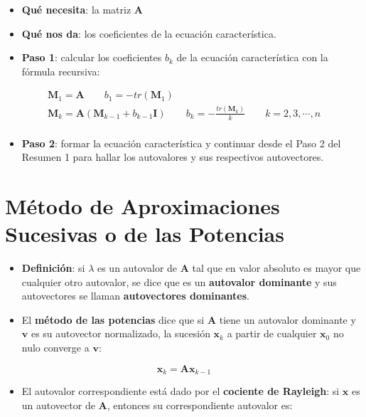 \documentclass[openany]{book}
\providecommand{\tightlist}{%
  \setlength{\itemsep}{0pt}\setlength{\parskip}{0pt}}
\begin{document}
\begin{itemize}
\tightlist
\item
  \textbf{Qué necesita}: la matriz \(\mathbf{A}\)
\item
  \textbf{Qué nos da}: los coeficientes de la ecuación característica.
\item
  \textbf{Paso 1}: calcular los coeficientes \(b_k\) de la ecuación característica con la fórmula recursiva:
\end{itemize}

\begin{gather*}
\textbf{M}_1 = \textbf{A} \qquad b_1 = - tr(\textbf{M}_1) \\
\textbf{M}_k = \textbf{A} (\textbf{M}_{k-1} + b_{k-1} \textbf{I}) \qquad b_k = - \frac{tr(\textbf{M}_k)}{k} \qquad k = 2, 3, \cdots, n\\
\end{gather*}

\begin{itemize}
\tightlist
\item
  \textbf{Paso 2}: formar la ecuación característica y continuar desde el Paso 2 del Resumen 1 para hallar los autovalores y sus respectivos autovectores.
\end{itemize}

\hypertarget{muxe9todo-de-aproximaciones-sucesivas-o-de-las-potencias}{%
\section{Método de Aproximaciones Sucesivas o de las Potencias}\label{muxe9todo-de-aproximaciones-sucesivas-o-de-las-potencias}}

\begin{itemize}
\item
  \textbf{Definición}: si \(\lambda\) es un autovalor de \(\textbf{A}\) tal que en valor absoluto es mayor que cualquier otro autovalor, se dice que es un \textbf{autovalor dominante} y sus autovectores se llaman \textbf{autovectores dominantes}.
\item
  El \textbf{método de las potencias} dice que si \(\textbf{A}\) tiene un autovalor dominante y \(\textbf{v}\) es su autovector normalizado, la sucesión \(\textbf{x}_k\) a partir de cualquier \(\textbf{x}_0\) no nulo converge a \(\textbf{v}\):
\end{itemize}

\[
\textbf{x}_k = \textbf{Ax}_{k-1}
\]

\begin{itemize}
\tightlist
\item
  El autovalor correspondiente está dado por el \textbf{cociente de Rayleigh}: si \(\textbf{x}\) es un autovector de \(\textbf{A}\), entonces su correspondiente autovalor es:
\end{itemize}
\end{document}
